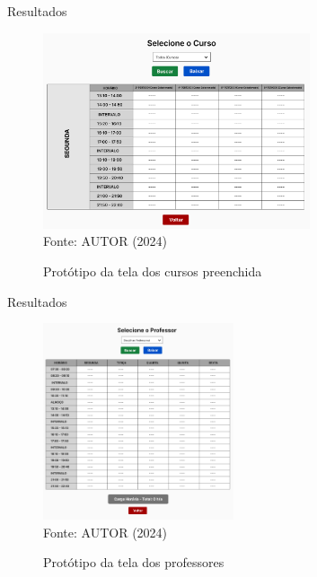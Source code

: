 \begin{frame}{Resultados}
    \begin{figure}
        \centering
        \vspace{-0.5cm}
        \caption{Protótipo da tela dos cursos preenchida}
        \vspace{-0.2cm}
        \includegraphics[width=0.7\textwidth]{figuras/proto-3.png}
        \\ %
        \small Fonte: AUTOR (2024)
    \end{figure}
\end{frame}

\begin{frame}{Resultados}
    \begin{figure}
        \centering
        \vspace{-0.5cm}
        \caption{Protótipo da tela dos professores}
        \vspace{-0.2cm}
        \includegraphics[width=0.5\textwidth]{figuras/proto-4.png}
        \\ %
        \small Fonte: AUTOR (2024)
    \end{figure}
\end{frame}

